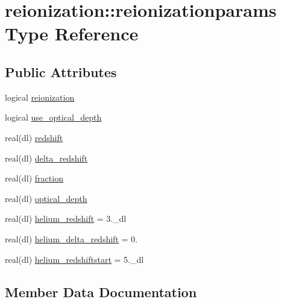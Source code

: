 \hypertarget{structreionization_1_1reionizationparams}{}\section{reionization\+:\+:reionizationparams Type Reference}
\label{structreionization_1_1reionizationparams}
\subsection*{Public Attributes}
\begin{DoxyCompactItemize}
\item 
logical \mbox{\hyperlink{structreionization_1_1reionizationparams_a3f022ff0d350953200be6e5ddf437835}{reionization}}
\item 
logical \mbox{\hyperlink{structreionization_1_1reionizationparams_a0b87f0d29701a86823951781e9e1430a}{use\+\_\+optical\+\_\+depth}}
\item 
real(dl) \mbox{\hyperlink{structreionization_1_1reionizationparams_aa970d8ae298fa4118620ca5dcb1e51e2}{redshift}}
\item 
real(dl) \mbox{\hyperlink{structreionization_1_1reionizationparams_aaa811018357d64be0d7911e0b662a4fc}{delta\+\_\+redshift}}
\item 
real(dl) \mbox{\hyperlink{structreionization_1_1reionizationparams_ab3633f03e27147e32f14d75878a46a0f}{fraction}}
\item 
real(dl) \mbox{\hyperlink{structreionization_1_1reionizationparams_a5374a44d29cf7487484842e580ec7d45}{optical\+\_\+depth}}
\item 
real(dl) \mbox{\hyperlink{structreionization_1_1reionizationparams_a794be84e5942a09662f4636509cd2716}{helium\+\_\+redshift}} = 3.\+\_\+dl
\item 
real(dl) \mbox{\hyperlink{structreionization_1_1reionizationparams_ad4bb5f6c2a9ddc8126bf9064dc8b5d8d}{helium\+\_\+delta\+\_\+redshift}} = 0.
\item 
real(dl) \mbox{\hyperlink{structreionization_1_1reionizationparams_aa8c8c446721f37de7edf65673a5c4994}{helium\+\_\+redshiftstart}} = 5.\+\_\+dl
\end{DoxyCompactItemize}


\subsection{Member Data Documentation}
\mbox{\label{structreionization_1_1reionizationparams_aaa811018357d64be0d7911e0b662a4fc}} 
